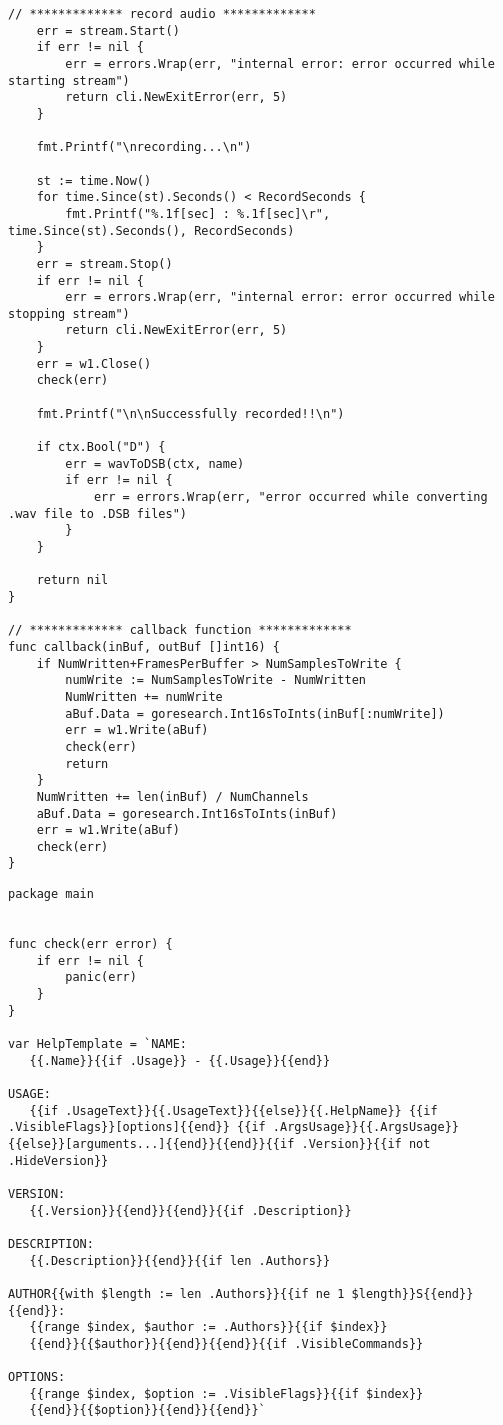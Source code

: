 \begin{lstlisting}[caption=cmd/multirecord/multirecord.go,label=multirecord/multirecord]
	// ************* record audio *************
	err = stream.Start()
	if err != nil {
		err = errors.Wrap(err, "internal error: error occurred while starting stream")
		return cli.NewExitError(err, 5)
	}

	fmt.Printf("\nrecording...\n")

	st := time.Now()
	for time.Since(st).Seconds() < RecordSeconds {
		fmt.Printf("%.1f[sec] : %.1f[sec]\r", time.Since(st).Seconds(), RecordSeconds)
	}
	err = stream.Stop()
	if err != nil {
		err = errors.Wrap(err, "internal error: error occurred while stopping stream")
		return cli.NewExitError(err, 5)
	}
	err = w1.Close()
	check(err)

	fmt.Printf("\n\nSuccessfully recorded!!\n")

	if ctx.Bool("D") {
		err = wavToDSB(ctx, name)
		if err != nil {
			err = errors.Wrap(err, "error occurred while converting .wav file to .DSB files")
		}
	}

	return nil
}

// ************* callback function *************
func callback(inBuf, outBuf []int16) {
	if NumWritten+FramesPerBuffer > NumSamplesToWrite {
		numWrite := NumSamplesToWrite - NumWritten
		NumWritten += numWrite
		aBuf.Data = goresearch.Int16sToInts(inBuf[:numWrite])
		err = w1.Write(aBuf)
		check(err)
		return
	}
	NumWritten += len(inBuf) / NumChannels
	aBuf.Data = goresearch.Int16sToInts(inBuf)
	err = w1.Write(aBuf)
	check(err)
}
\end{lstlisting}

\begin{lstlisting}[caption=cmd/multirecord/util.go,label=multirecord/util]
package main


func check(err error) {
	if err != nil {
		panic(err)
	}
}

var HelpTemplate = `NAME:
   {{.Name}}{{if .Usage}} - {{.Usage}}{{end}}

USAGE:
   {{if .UsageText}}{{.UsageText}}{{else}}{{.HelpName}} {{if .VisibleFlags}}[options]{{end}} {{if .ArgsUsage}}{{.ArgsUsage}}{{else}}[arguments...]{{end}}{{end}}{{if .Version}}{{if not .HideVersion}}

VERSION:
   {{.Version}}{{end}}{{end}}{{if .Description}}

DESCRIPTION:
   {{.Description}}{{end}}{{if len .Authors}}

AUTHOR{{with $length := len .Authors}}{{if ne 1 $length}}S{{end}}{{end}}:
   {{range $index, $author := .Authors}}{{if $index}}
   {{end}}{{$author}}{{end}}{{end}}{{if .VisibleCommands}}

OPTIONS:
   {{range $index, $option := .VisibleFlags}}{{if $index}}
   {{end}}{{$option}}{{end}}{{end}}`
\end{lstlisting}

